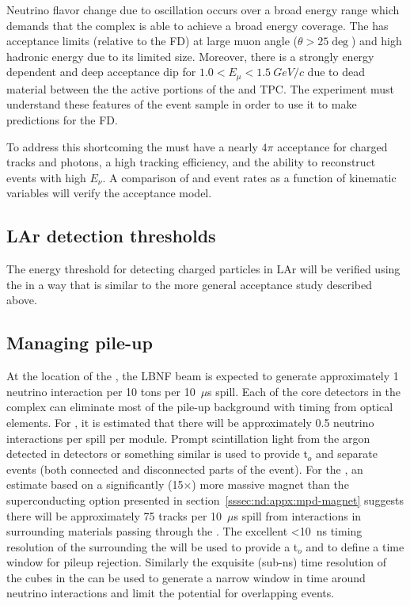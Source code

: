 Neutrino flavor change due to oscillation occurs over a broad energy range which demands that the   complex is able to achieve a broad energy coverage. The \larnd has acceptance limits (relative to the FD) at large muon angle ($\theta > 25\deg$) and high hadronic energy due to its limited size. Moreover, there is a strongly energy dependent and deep acceptance dip for $1.0 < E_\mu < 1.5~GeV/c$ due to dead material between the the active portions of the \larnd and  TPC. The experiment must understand these features of the \larnd event sample in order to use it to make predictions for the FD. 

To address this shortcoming the  must have a nearly $4\pi$ acceptance for charged tracks and photons, a high tracking efficiency, and the ability to reconstruct events with high $E_\nu$. A comparison of  and \larnd event rates as a function of kinematic variables will verify the \larnd acceptance model. 



\subsection{LAr detection thresholds}

The energy threshold for detecting charged particles in LAr will be verified using the  in a way that is similar to the more general \larnd acceptance study described above. 

\subsection{Managing pile-up}
At the location of the  , the LBNF beam is expected to generate approximately 1 neutrino interaction per 10 tons per 10~$\mu$s spill.   
Each of the core detectors in the  complex can eliminate most of the pile-up background with timing from optical elements. For , it is estimated that there will be approximately 0.5 neutrino interactions per spill per  module. Prompt scintillation light from the argon detected in  detectors or something similar is used to provide t$_{o}$ and separate events (both connected and disconnected parts of the event).  For the , an estimate based on a significantly (15$\times$) more massive magnet than the superconducting option presented in section~\ref{sssec:nd:appx:mpd-magnet} suggests there will be approximately 75 tracks per 10~$\mu$s spill from interactions in surrounding materials passing through the .  The excellent <10~ns timing resolution of the  surrounding the  will be used to provide a t$_{o}$ and to define a time window for pileup rejection.  Similarly the exquisite (sub-ns) time resolution of the cubes in the  can be used to generate a narrow window in time around neutrino interactions and limit the potential for overlapping events.  



